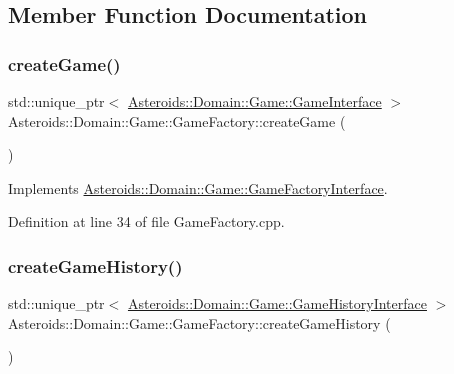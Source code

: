 \subsection{Member Function Documentation}
\mbox{\label{classAsteroids_1_1Domain_1_1Game_1_1GameFactory_a87ce9a05bdee942acbc9434d32749a76}} 
\subsubsection{\texorpdfstring{create\+Game()}{createGame()}}
{\footnotesize\ttfamily std\+::unique\+\_\+ptr$<$ \hyperlink{classAsteroids_1_1Domain_1_1Game_1_1GameInterface}{Asteroids\+::\+Domain\+::\+Game\+::\+Game\+Interface} $>$ Asteroids\+::\+Domain\+::\+Game\+::\+Game\+Factory\+::create\+Game (\begin{DoxyParamCaption}{ }\end{DoxyParamCaption})\hspace{0.3cm}{\ttfamily [virtual]}}



Implements \hyperlink{classAsteroids_1_1Domain_1_1Game_1_1GameFactoryInterface_afee076bbbb08048be9df4e7bbc80d4c1}{Asteroids\+::\+Domain\+::\+Game\+::\+Game\+Factory\+Interface}.



Definition at line 34 of file Game\+Factory.\+cpp.

\mbox{\label{classAsteroids_1_1Domain_1_1Game_1_1GameFactory_a1433b01f9a0f1ed45920fd9fb86f50da}} 
\subsubsection{\texorpdfstring{create\+Game\+History()}{createGameHistory()}}
{\footnotesize\ttfamily std\+::unique\+\_\+ptr$<$ \hyperlink{classAsteroids_1_1Domain_1_1Game_1_1GameHistoryInterface}{Asteroids\+::\+Domain\+::\+Game\+::\+Game\+History\+Interface} $>$ Asteroids\+::\+Domain\+::\+Game\+::\+Game\+Factory\+::create\+Game\+History (\begin{DoxyParamCaption}{ }\end{DoxyParamCaption})\hspace{0.3cm}{\ttfamily [virtual]}}




